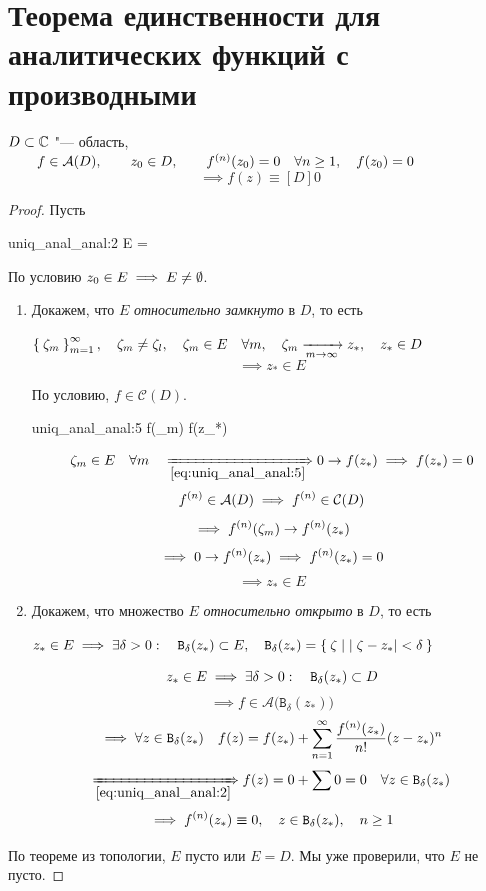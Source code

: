 \section{Теорема единственности для аналитических функций с производными}

\begin{theorem}
	$ D \subset \mathbb{C} $ "--- область, $ \qquad f \in \mathcal A(D), \qquad z_0 \in D, \qquad {f}^{({n})}(z_0) = 0 \quad \forall n \ge 1, \quad f(z_0) = 0 $
	$$ \implies f(z) \equiv[D] 0 $$
\end{theorem}

\begin{proof}
	Пусть
	\begin{equ}{uniq_anal_anal:2}
		E = 
	\end{equ}
	По условию $ z_0 \in E \implies E \ne \emptyset $.

	\begin{enumerate}
		\item Докажем, что $ E $ \emph{относительно замкнуто} в $ D $, то есть
			\begin{statement}\label{stmt:rel_cl}
				$ \Set{\zeta_m}_{m=1}^{\infty}, \quad \zeta_m \ne \zeta_l, \quad \zeta_m \in E \quad \forall m, \quad \zeta_m \xrightarrow[m \to \infty]{} z_*, \quad z_* \in D $
				$$ \implies z_* \in E $$
			\end{statement}

			По условию, $ f \in \mathcal C(D) $.
			\begin{equ}{uniq_anal_anal:5}
				 f(\zeta_m) \to f(z_*)
			\end{equ}
			$$ \zeta_m \in E \quad \forall m \quad \underimp{\eref{uniq_anal_anal:5}} 0 \to f(z_*) \implies f(z_*) = 0 $$
			$$ {f}^{({n})} \in \mathcal A(D) \implies {f}^{({n})} \in \mathcal C(D) $$
			$$ \implies {f}^{({n})}(\zeta_m) \to {f}^{({n})}(z_*) $$
			$$ \implies 0 \to {f}^{({n})}(z_*) \implies {f}^{({n})}(z_*) = 0 $$
			$$ \implies z_* \in E $$

		\item Докажем, что множество $ E $ \emph{относительно открыто} в $ D $, то есть
			\begin{statement}
				$ z_* \in E \implies \exists \delta > 0 : \quad \mathtt B_\delta (z_*) \subset E, \quad \mathtt B_\delta (z_*) = \Set{\zeta \mid |\zeta - z_*| < \delta} $
			\end{statement}
			$$ z_* \in E \implies \exists \delta > 0 : \quad \mathtt B_\delta(z_*) \subset D $$
			$$ \implies f \in \mathcal A \big( \mathtt B_\delta(z_*) \big) $$
			$$ \implies \forall z \in \mathtt B_\delta (z_*) \quad f(z) = f(z_*) + \sum_{n = 1}^\infty \frac{{f}^{({n})}(z_*)}{n!} (z - z_*)^n $$
			$$ \underimp{\eref{uniq_anal_anal:2}} f(z) = 0 + \sum 0 = 0 \quad \forall z \in \mathtt B_\delta (z_*) $$
		$$ \implies \nder f(z_*) \equiv 0, \quad z \in \mathtt B_\delta (z_*), \quad n \ge 1 $$
	\end{enumerate}
	По теореме из топологии, $ E $ пусто или $ E = D $. Мы уже проверили, что $ E $ не пусто.
\end{proof}

